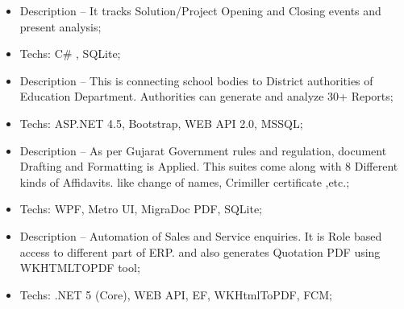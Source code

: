 \documentclass[10pt,a4paper]{altacv}
\begin{document}
\divider
%



\begin{itemize}
  \item Description -- It tracks Solution/Project Opening and Closing events and present analysis;
  \item Techs: C\# , SQLite;
\end{itemize}

\divider

%


\begin{itemize}
  \item Description -- This is connecting school bodies to District authorities of Education Department. Authorities  can generate and analyze 30+ Reports;
  \item Techs: ASP.NET 4.5, Bootstrap, WEB API 2.0, MSSQL;
\end{itemize}

\divider

\begin{itemize}
  \item Description -- As per Gujarat Government rules and regulation, document Drafting and Formatting is Applied. This suites come along with 8 Different kinds of Affidavits. like change of names, Crimiller certificate ,etc.;
  \item Techs: WPF, Metro UI, MigraDoc PDF, SQLite;
\end{itemize}

\divider

%

\begin{itemize}
  \item Description -- Automation of Sales and Service enquiries. It is Role based access to different part of ERP. and also generates Quotation PDF using WKHTMLTOPDF tool;
  \item Techs: .NET 5 (Core), WEB API, EF, WKHtmlToPDF, FCM;
\end{itemize}
\end{document}
